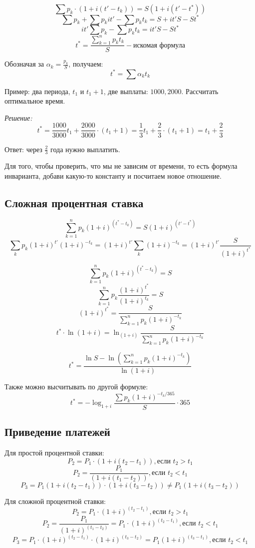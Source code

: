 \documentclass[aps,%
12pt,%
final,%
oneside,
onecolumn,%
musixtex, %
superscriptaddress,%
centertags]{article} %
\begin{document}
$$\sum p_k \cdot (1 + i (t'-t_k)) = S (1 + i(t' - t^*))$$
$$\sum p_k + \sum p_kit' - \sum p_kt_k = S + it'S - St^*$$
$$it'\sum p_k - \sum p_kt_k = it'S - St^*$$
$$t^* = \frac{\sum_{k=1}^{n} p_k t_k}{S} - \text{искомая формула}$$

Обозначая за $\alpha_k = \frac{p_k}{S}$, получаем:
$$t^* = \sum \alpha_k t_k$$

Пример: два периода, $t_1$ и $t_1+1$, две выплаты: $1000,2000$. Рассчитать оптимальное время.

\textit{Решение:}
$$t^* = \frac{1000}{3000}t_1 + \frac{2000}{3000} \cdot (t_1+1) = \frac{1}{3}t_1 + \frac{2}{3} \cdot (t_1+1) = t_1 + \frac{2}{3}$$

Ответ: через $\frac{2}{3}$ года нужно выплатить.

Для того, чтобы проверить, что мы не зависим от времени, то есть формула инварианта, добави какую-то константу и посчитаем новое отношение.

\subsection{Сложная процентная ставка}

$$\sum_{k=1}^{n} p_k (1+i)^{(t^*-t_k)} = S (1+i)^{(t'-t^*)}$$
$$\sum_{k} p_k (1+i)^{t'} (1+i)^{-t_k} = (1+i)^{t'}\sum_{k} (1+i)^{-t_k} = (1+i)^{t'}\frac{S }{(1+i)^{t^*}}$$

$$\sum_{k=1}^{n} p_k (1+i)^{(t^*-t_k)} = S$$
$$\sum_{k=1}^{n} p_k \frac{(1+i)^{t^*}}{(1+i)^{t_k}} = S$$
$$(1+i)^{t^*} = \frac{S}{\sum_{k=1}^{n} p_k (1+i)^{-t_k} }$$
$$t^* \cdot \ln (1+i)= \ln_{(1+i)} \frac{S}{\sum_{k=1}^{n} p_k (1+i)^{-t_k} } $$

$$t^* = \frac{\ln S -\ln ( \sum_{k=1}^{n} p_k (1+i)^{-t_k})}{\ln (1+i)}$$

Также можно высчитывать по другой формуле:
$$ t^* = - \log_{1+i} \frac{\sum p_k (1+i)^{-t_k/365}}{S} \cdot 365$$

\subsection{Приведение платежей}
Для простой процентной ставки:
$$ P_2 = P_1 \cdot (1 + i (t_2-t_1)), \text{если } t_2 > t_1 $$
$$ P_2 = \frac {P_1}{(1+i(t_1-t_2))}, \text{если } t_2 < t_1 $$
$$ P_3 = P_1 (1+i(t_2-t_1)) \cdot (1+i(t_3-t_2)) \neq P_1 (1+i(t_3-t_2))$$

Для сложной процентной ставки:
$$ P_2 = P_1 \cdot (1 + i)^{(t_2-t_1)}, \text{если } t_2 > t_1 $$
$$ P_2 = \frac{P_1}{(1+i)^{(t_1-t_2)}} = P_1 \cdot (1 + i)^{(t_2-t_1)}, \text{если } t_2 < t_1$$
$$ P_3 =P_1 \cdot (1 + i)^{(t_2-t_1)} \cdot (1 + i)^{(t_3-t_2)} = P_1 (1+i)^{(t_3-t_1)}, \text{если } t_2 < t_1$$
\end{document}
